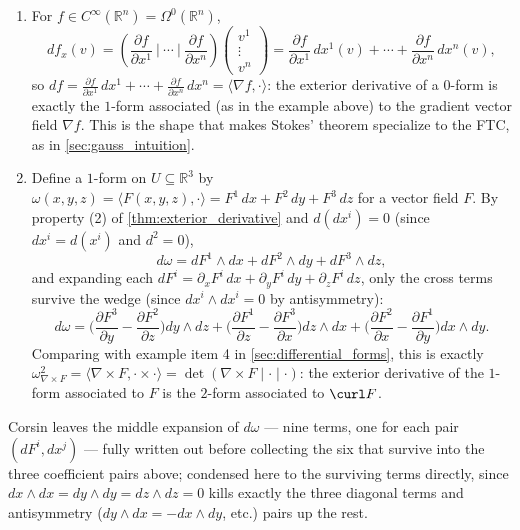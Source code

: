 \begin{example}
\label{ex:exterior_derivative_gradient_curl}
\begin{enumerate}[label=\textbf{\arabic*.}]
  \item For $f \in C^\infty(\mathbb{R}^n) = \Omega^0(\mathbb{R}^n)$,
  \[df_x(v) = \left(\frac{\partial f}{\partial x^1}\ \Big|\ \cdots\ \Big|\ \frac{\partial f}
    {\partial x^n}\right)\!\begin{pmatrix}v^1\\ \vdots \\ v^n\end{pmatrix}
    = \frac{\partial f}{\partial x^1}\,dx^1(v) + \cdots + \frac{\partial f}{\partial x^n}\,
    dx^n(v),\]
  so $df = \frac{\partial f}{\partial x^1}\,dx^1 + \cdots + \frac{\partial f}{\partial x^n}\,
  dx^n = \langle \nabla f,\cdot\rangle$: the exterior derivative of a $0$-form is exactly the
  $1$-form associated (as in the example above) to the gradient vector field $\nabla f$. This
  is the shape that makes Stokes' theorem specialize to the FTC, as in
  \cref{sec:gauss_intuition}.
  \item Define a $1$-form on $U \subseteq \mathbb{R}^3$ by $\omega(x,y,z) = \langle
  F(x,y,z),\cdot\rangle = F^1\,dx+F^2\,dy+F^3\,dz$ for a vector field $F$. By property (2) of
  \cref{thm:exterior_derivative} and $d(dx^i)=0$ (since $dx^i = d(x^i)$ and $d^2=0$),
  \[
  d\omega = dF^1\wedge dx + dF^2\wedge dy + dF^3\wedge dz,
  \]
  and expanding each $dF^i = \partial_x F^i\,dx+\partial_y F^i\,dy+\partial_z F^i\,dz$, only
  the cross terms survive the wedge (since $dx^i\wedge dx^i=0$ by antisymmetry):
  \[
  d\omega = \Big(\frac{\partial F^3}{\partial y}-\frac{\partial F^2}{\partial z}\Big)dy\wedge
    dz + \Big(\frac{\partial F^1}{\partial z}-\frac{\partial F^3}{\partial x}\Big)dz\wedge dx
    + \Big(\frac{\partial F^2}{\partial x}-\frac{\partial F^1}{\partial y}\Big)dx\wedge dy.
  \]
  Comparing with example item 4 in \cref{sec:differential_forms}, this is exactly
  $\omega_{\nabla\times F}^2 = \langle\nabla\times F,\cdot\times\cdot\rangle = \det(\nabla
  \times F\mid\cdot\mid\cdot)$: the exterior derivative of the $1$-form associated to $F$ is
  the $2$-form associated to $\curl F$.
  \end{enumerate}
\end{example}

\begin{ainote}
Corsin leaves the middle expansion of $d\omega$ --- nine terms, one for each pair
$(dF^i,dx^j)$ --- fully written out before collecting the six that survive into the three
coefficient pairs above; condensed here to the surviving terms directly, since $dx\wedge
dx=dy\wedge dy=dz\wedge dz=0$ kills exactly the three diagonal terms and antisymmetry
($dy\wedge dx=-dx\wedge dy$, etc.) pairs up the rest.
\end{ainote}

